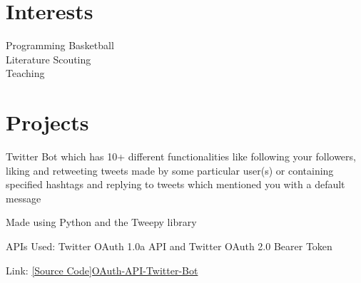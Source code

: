 \documentclass[]{deedy-resume-openfont}
\begin{document}
\begin{minipage}[t]{0.33\textwidth}
%
%

\section{Interests}
Programming \textbullet{} Basketball \textbullet{} \\
Literature \textbullet{} Scouting \textbullet{} \\
Teaching \\
\sectionsep

%
%

\end{minipage} 
\hfill
\begin{minipage}[t]{0.66\textwidth} 

%
%

\section{Projects}
\vspace{\topsep}
\begin{tightemize}
\item Twitter Bot which has 10+ different functionalities like following your followers, liking and retweeting tweets made by some particular user(s) or containing specified hashtags and replying to tweets which mentioned you with a default message
\item Made using Python and the Tweepy library
\item APIs Used: Twitter OAuth 1.0a API and Twitter OAuth 2.0 Bearer Token
\item Link: \href{https://github.com/utsavsingh899/OAuth-API-Twitter-Bot}{[Source Code]OAuth-API-Twitter-Bot}
\end{tightemize}
\sectionsep


\end{minipage}
\end{document}
